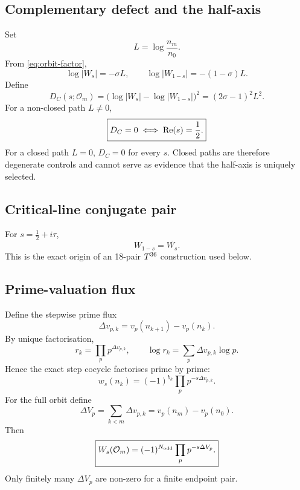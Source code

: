 \subsection{Complementary defect and the half-axis}

Set
\begin{equation}
L=\log\frac{n_m}{n_0}.
\end{equation}
From \eqref{eq:orbit-factor},
\begin{equation}
\log|W_s|=-\sigma L,
\qquad
\log|W_{1-s}|=-(1-\sigma)L.
\end{equation}
Define
\begin{equation}
\boxed{
D_C(s;\mathcal O_m)
=
\big(\log|W_s|-\log|W_{1-s}|\big)^2
=(2\sigma-1)^2L^2.
}
\label{eq:collatz-defect}
\end{equation}
For a non-closed path \(L\neq0\),
\begin{equation}
\boxed{D_C=0\iff \operatorname{Re}(s)=\frac12.}
\end{equation}
For a closed path \(L=0\), \(D_C=0\) for every \(s\). Closed paths are therefore degenerate controls and cannot serve as evidence that the half-axis is uniquely selected.

\subsection{Critical-line conjugate pair}

For \(s=\tfrac12+i\tau\),
\begin{equation}
\boxed{W_{1-s}=\overline{W_s}.}
\end{equation}
This is the exact origin of an 18-pair \(T^{36}\) construction used below.

\subsection{Prime-valuation flux}

Define the stepwise prime flux
\begin{equation}
\boxed{\Delta v_{p,k}=v_p(n_{k+1})-v_p(n_k).}
\label{eq:prime-flux}
\end{equation}
By unique factorisation,
\begin{equation}
\boxed{r_k=\prod_p p^{\Delta v_{p,k}},}
\qquad
\log r_k=\sum_p\Delta v_{p,k}\log p.
\end{equation}
Hence the exact step cocycle factorises prime by prime:
\begin{equation}
\boxed{
w_s(n_k)
=(-1)^{b_k}\prod_p p^{-s\Delta v_{p,k}}.
}
\label{eq:prime-cocycle}
\end{equation}
For the full orbit define
\begin{equation}
\Delta V_p=\sum_{k<m}\Delta v_{p,k}=v_p(n_m)-v_p(n_0).
\end{equation}
Then
\begin{equation}
\boxed{
W_s(\mathcal O_m)=(-1)^{N_{\rm odd}}\prod_p p^{-s\Delta V_p}.
}
\label{eq:prime-orbit}
\end{equation}
Only finitely many \(\Delta V_p\) are non-zero for a finite endpoint pair.

